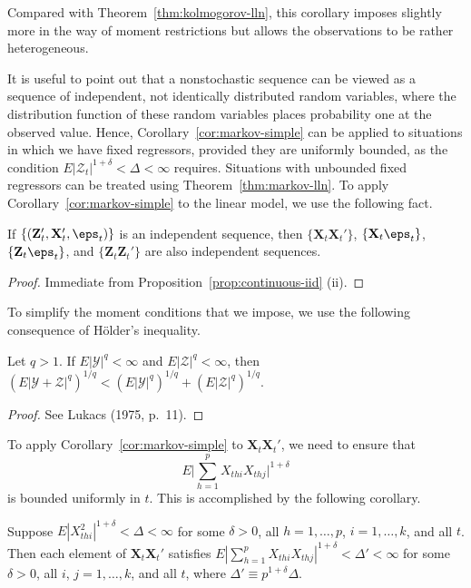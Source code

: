 Compared with Theorem~\ref{thm:kolmogorov-lln}, this corollary imposes slightly more in the way of moment restrictions but allows the observations to be rather heterogeneous.

It is useful to point out that a nonstochastic sequence can be viewed as a sequence of independent, not identically distributed random variables, where the distribution function of these random variables places probability one at the observed value. Hence, Corollary~\ref{cor:markov-simple} can be applied to situations in which we have fixed regressors, provided they are uniformly bounded, as the condition $E|\mathcal{Z}_t|^{1+\delta} < \Delta < \infty$ requires. Situations with unbounded fixed regressors can be treated using Theorem~\ref{thm:markov-lln}. To apply Corollary~\ref{cor:markov-simple} to the linear model, we use the following fact.

\begin{proposition}\label{prop:independent-products}
If $\{(\mathbf{Z}_t', \mathbf{X}_t', \eps_t)\}$ is an independent sequence, then $\{\mathbf{X}_t \mathbf{X}_t'\}$, $\{\mathbf{X}_t \eps_t\}$, $\{\mathbf{Z}_t \eps_t\}$, and $\{\mathbf{Z}_t \mathbf{Z}_t'\}$ are also independent sequences.
\end{proposition}

\begin{proof}
Immediate from Proposition~\ref{prop:continuous-iid} (ii). \qedhere
\end{proof}

To simplify the moment conditions that we impose, we use the following consequence of H\"{o}lder's inequality.

\begin{proposition}\label{prop:minkowski}
Let $q > 1$. If $E|\mathcal{Y}|^q < \infty$ and $E|\mathcal{Z}|^q < \infty$, then $(E|\mathcal{Y} + \mathcal{Z}|^q)^{1/q} < (E|\mathcal{Y}|^q)^{1/q} + (E|\mathcal{Z}|^q)^{1/q}$.
\end{proposition}

\begin{proof}
See Lukacs (1975, p.~11). \qedhere
\end{proof}

To apply Corollary~\ref{cor:markov-simple} to $\mathbf{X}_t \mathbf{X}_t'$, we need to ensure that
\[
E\bigl|\sum_{h=1}^{p} X_{thi} X_{thj}\bigr|^{1+\delta}
\]
is bounded uniformly in $t$. This is accomplished by the following corollary.

\begin{corollary}\label{cor:moment-bound}
Suppose $E|X_{thi}^2|^{1+\delta} < \Delta < \infty$ for some $\delta > 0$, all $h = 1, \ldots, p$, $i = 1, \ldots, k$, and all $t$. Then each element of $\mathbf{X}_t \mathbf{X}_t'$ satisfies $E|\sum_{h=1}^{p} X_{thi} X_{thj}|^{1+\delta} < \Delta' < \infty$ for some $\delta > 0$, all $i$, $j = 1, \ldots, k$, and all $t$, where $\Delta' \equiv p^{1+\delta} \Delta$.
\end{corollary}

